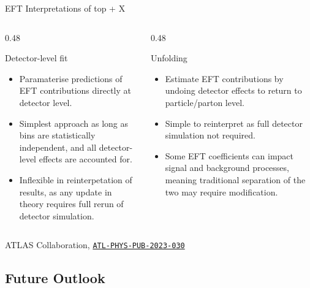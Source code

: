 \documentclass{beamer}
\begin{document}
\begin{frame}{EFT Interpretations of top + X}
  \begin{columns}
    \begin{column}{0.48\textwidth}
      \begin{block}{Detector-level fit}
        \begin{itemize}
          \item Paramaterise predictions of EFT contributions directly at detector level.
          \item Simplest approach as long as bins are statistically independent, and all detector-level effects are accounted for.
          \item Inflexible in reinterpetation of results, as any update in theory requires full rerun of detector simulation.
        \end{itemize}
      \end{block}
    \end{column}
    \begin{column}{0.48\textwidth}
      \begin{block}{Unfolding}
        \begin{itemize}
          \item Estimate EFT contributions by undoing detector effects to return to particle/parton level.
          \item Simple to reinterpret as full detector simulation not required.
          \item Some EFT coefficients can impact signal and background processes, meaning traditional separation of the two may require modification. 
          \vspace{\baselineskip}
        \end{itemize}
      \end{block}
    \end{column}
  \end{columns}
  {\tiny \color{gray} ATLAS Collaboration, \href{https://cds.cern.ch/record/2872789/}{\texttt{ATL-PHYS-PUB-2023-030}}}
\end{frame}

\subsection{Future Outlook}
\end{document}
